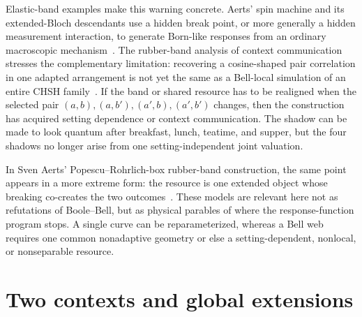 \documentclass[aps,pra,reprint,superscriptaddress,nofootinbib,floatfix]{revtex4-2}
\begin{document}
Elastic-band examples make this warning concrete.  Aerts' spin machine and
its extended-Bloch descendants use a hidden break point, or more generally a
hidden measurement interaction, to generate Born-like responses from an
ordinary macroscopic mechanism~\cite{aerts-69,Aerts_2014,Aerts_2016}.  The
rubber-band analysis of context communication stresses the complementary
limitation: recovering a cosine-shaped pair correlation in one adapted
arrangement is not yet the same as a Bell-local simulation of an entire CHSH
family~\cite{svozil-2022-epr}.  If the band or shared resource has to be
realigned when the selected pair
\((a,b),(a,b'),(a',b),(a',b')\) changes, then the construction has acquired
setting dependence or context communication.  The shadow can be made to look
quantum after breakfast, lunch, teatime, and supper, but the four shadows no
longer arise from one setting-independent joint valuation.

In Sven Aerts' Popescu--Rohrlich-box rubber-band construction, the same point
appears in a more extreme form: the resource is one extended object whose
breaking co-creates the two outcomes~\cite{AertsSven}.  These models are
relevant here not as refutations of Boole--Bell, but as physical parables of
where the response-function program stops.  A single curve can be
reparameterized, whereas a Bell web requires one common nonadaptive geometry
or else a setting-dependent, nonlocal, or nonseparable resource.

\section{Two contexts and global extensions}
\label{sec:two-contexts}
\end{document}
